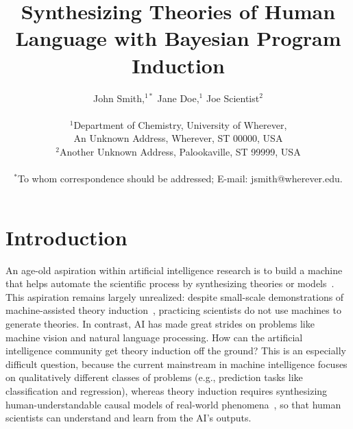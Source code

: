 \documentclass[12pt]{article}
\title{Synthesizing Theories of Human Language with Bayesian Program Induction}
\author
{John Smith,$^{1\ast}$ Jane Doe,$^{1}$ Joe Scientist$^{2}$\\
\\
\normalsize{$^{1}$Department of Chemistry, University of Wherever,}\\
\normalsize{An Unknown Address, Wherever, ST 00000, USA}\\
\normalsize{$^{2}$Another Unknown Address, Palookaville, ST 99999, USA}\\
\\
\normalsize{$^\ast$To whom correspondence should be addressed; E-mail:  jsmith@wherever.edu.}
}
\date{}
\newenvironment{sciabstract}{%
\begin{quote} \bf}
{\end{quote}}
\begin{document}
 


\baselineskip24pt


\maketitle 




\begin{sciabstract}
\end{sciabstract}




\section*{Introduction}

An age-old aspiration within artificial intelligence research is to
build a machine that helps automate the scientific process by
synthesizing theories or
models~\cite{paul1990autonomous,langley1987scientific,schmidt2009distilling}.
This aspiration remains largely unrealized: despite small-scale
demonstrations of machine-assisted theory
induction~\cite{Langley1981BACON5TD,schmidt2009distilling}, practicing
scientists do not use machines to generate theories.  In contrast, AI
has made great strides on problems like machine vision and natural
language processing.  How can the artificial intelligence community
get theory induction off the ground?  This is an especially difficult
question, because the current mainstream in machine intelligence
focuses on qualitatively different classes of problems (e.g.,
prediction tasks like classification and regression), whereas theory
induction requires synthesizing human-understandable causal models of
real-world phenomena~\cite{pearl2009causality}, so that human
scientists can understand and learn from the AI's outputs.
\end{document}
